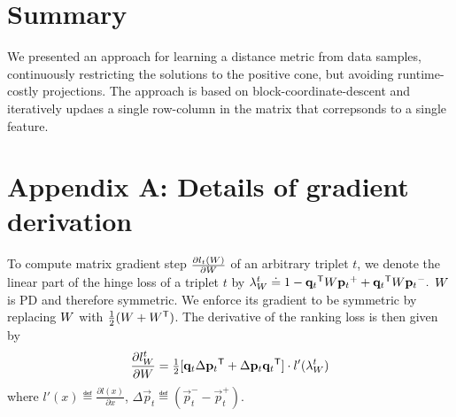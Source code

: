 \documentclass{article}
\begin{document}
\section{Summary}
We presented an approach for learning a distance metric from data samples,  continuously restricting the solutions to the positive cone, but avoiding runtime-costly projections. The approach is based on block-coordinate-descent and iteratively updaes a single row-column in the matrix that correpsonds to a single feature. 




\appendix
\section*{Appendix A: Details of gradient derivation}
\label{appendix-grad}

To compute matrix gradient step  $\frac{\partial {l_t ({W})}}{\partial {W}}$ of an arbitrary triplet $t$, we denote the linear part of the hinge loss of a triplet $t$ by
$\lambda_{W}^t \doteq 
1-{{\mathbf{q}}_{{t}}}{}^\mathsf{T} {W} {{\mathbf{p}}_{{t}}}^{+} + {{\mathbf{q}}_{{t}}}{}^\mathsf{T}{W}{{\mathbf{p}}_{{t}}}^{-}.$
${W}$ is PD and therefore symmetric. We enforce its gradient to be symmetric by replacing ${W}$ with $\tfrac{1}{2}({W} + {W}{}^\mathsf{T})$.
The derivative of the ranking loss is then given by
\begin{equation}
\frac{\partial {l_{{W}}^{t}}}{\partial {W}} = \tfrac{1}{2}[\mathbf{q}_{t}\Delta\mathbf{p}_{t}{}^\mathsf{T}  + \Delta\mathbf{p}_{t}\mathbf{q}_{t}{}^\mathsf{T}]\cdot {l'}(\lambda_{W}^t)
\label{dlossranking}
\end{equation} where $l'(x) \eqdef \frac{\partial {l(x)}}{\partial x}$, $\Delta\vec{p}_{t} \eqdef (\vec{p}_{t}^{-} - \vec{p}_{t}^{+})$.
\end{document}
